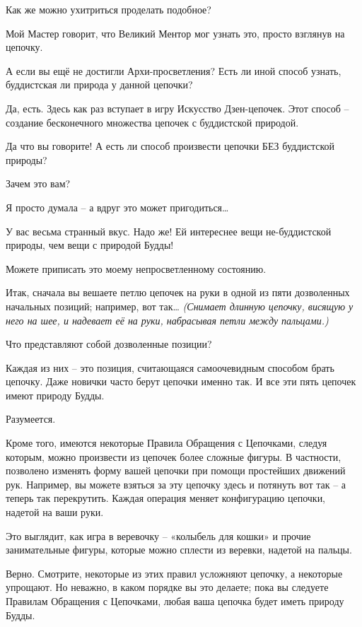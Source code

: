 \documentclass[../main.tex]{subfiles}
\begin{document}
\begin{dialogue}
 Как же можно ухитриться проделать подобное?

 Мой Мастер говорит, что Великий Ментор мог узнать это, просто взглянув на цепочку.

 А если вы ещё не достигли Архи-просветления? Есть ли иной способ узнать, буддистская ли природа у данной цепочки?

 Да, есть. Здесь как раз вступает в игру Искусство Дзен-цепочек. Этот способ \--- создание бесконечного множества цепочек с буддистской природой.

 Да что вы говорите! А есть ли способ произвести цепочки БЕЗ буддистской природы?

 Зачем это вам?

 Я просто думала \--- а вдруг это может пригодиться\ldots{}

 У вас весьма странный вкус. Надо же! Ей интереснее вещи не-буддистской природы, чем вещи с природой Будды!

 Можете приписать это моему непросветленному состоянию.

 Итак, сначала вы вешаете петлю цепочек на руки в одной из пяти дозволенных начальных позиций; например, вот так\ldots{} \emph{(Снимает длинную цепочку, висящую у него на шее, и надевает её на руки, набрасывая петли между пальцами.)}

 Что представляют собой дозволенные позиции?

 Каждая из них \--- это позиция, считающаяся самоочевидным способом брать цепочку. Даже новички часто берут цепочки именно так. И все эти пять цепочек имеют природу Будды.

 Разумеется.

 Кроме того, имеются некоторые Правила Обращения с Цепочками, следуя которым, можно произвести из цепочек более сложные фигуры. В частности, позволено изменять форму вашей цепочки при помощи простейших движений рук. Например, вы можете взяться за эту цепочку здесь и потянуть вот так \--- а теперь так перекрутить. Каждая операция меняет конфигурацию цепочки, надетой на ваши руки.

 Это выглядит, как игра в веревочку \--- «колыбель для кошки» и прочие занимательные фигуры, которые можно сплести из веревки, надетой на пальцы.

 Верно. Смотрите, некоторые из этих правил усложняют цепочку, а некоторые упрощают. Но неважно, в каком порядке вы это делаете; пока вы следуете Правилам Обращения с Цепочками, любая ваша цепочка будет иметь природу Будды.


\end{dialogue}
\end{document}
